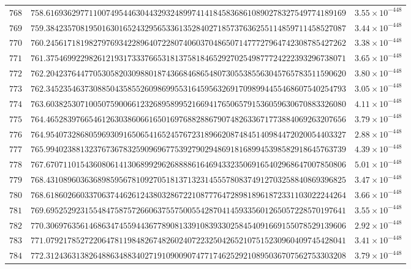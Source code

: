 \documentclass[12pt,reqno]{amsart}
\theoremstyle{remark}
\begin{document}
\begin{longtable}{clc}
$768$ & $758.6169362977110074954463044329324899741418458368610890278327549774189169$ & $3.55\times 10^{-448}$ \\
$769$ & $759.3842357081950163016524329565336135284027185737636255114859711458527087$ & $3.44\times 10^{-448}$ \\
$770$ & $760.2456171819827976934228964072280740603704865071477727964742308785427262$ & $3.38\times 10^{-448}$ \\
$771$ & $761.3754699229826121931733376653181375818465292702549877724222393296738071$ & $3.65\times 10^{-448}$ \\
$772$ & $762.2042376447705305820309880187436684686548073055385563045765783511590620$ & $3.80\times 10^{-448}$ \\
$773$ & $762.3452354637308850435855260986995531645956326917098994455468607540254793$ & $3.05\times 10^{-448}$ \\
$774$ & $763.6038253071005075900661232689589952166941765065791536059630670883326080$ & $4.11\times 10^{-448}$ \\
$775$ & $764.4652839766546126303860661650169768828867907482633671773884069263207656$ & $3.79\times 10^{-448}$ \\
$776$ & $764.9540732868059693091650654165245767231896620874845140984472020054403327$ & $2.88\times 10^{-448}$ \\
$777$ & $765.9940238813237673678325909696775392790294869181689945398582918645763739$ & $4.39\times 10^{-448}$ \\
$778$ & $767.6707110154360806141306899296268888616469433235069165402968647007850806$ & $5.01\times 10^{-448}$ \\
$779$ & $768.4310896036368985956781092705181371323145557808374912703258840869396825$ & $3.47\times 10^{-448}$ \\
$780$ & $768.6186026603370637446261243803286722108777647289818961872331103022244264$ & $3.66\times 10^{-448}$ \\
$781$ & $769.6952529231554847587572660637557500554287041459335601265057228570197641$ & $3.55\times 10^{-448}$ \\
$782$ & $770.3069763561468634745594436778908133910839330258454091669155078529139606$ & $2.92\times 10^{-448}$ \\
$783$ & $771.0792178527220647811984826748260240722325042652107515230960409745428041$ & $3.41\times 10^{-448}$ \\
$784$ & $772.3124363138264886348834027191090090747717462529210895036707562753303208$ & $3.79\times 10^{-448}$ \\

\end{longtable}
\end{document}
